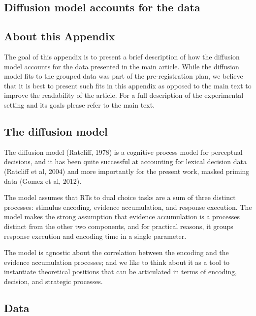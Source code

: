 \documentclass[
  english,
  man,floatsintext]{apa6}
\begin{document}
\begin{appendix}
\hypertarget{diffusion-model-accounts-for-the-data}{%
\section{Diffusion model accounts for the
data}\label{diffusion-model-accounts-for-the-data}}

\hypertarget{about-this-appendix}{%
\subsection{About this Appendix}\label{about-this-appendix}}

The goal of this appendix is to present a brief description of how the
diffusion model accounts for the data presented in the main article.
While the diffusion model fits to the grouped data was part of the
pre-registration plan, we believe that it is best to present such fits
in this appendix as opposed to the main text to improve the readability
of the article. For a full description of the experimental setting and
its goals please refer to the main text.

\hypertarget{the-diffusion-model}{%
\subsection{The diffusion model}\label{the-diffusion-model}}

The diffusion model (Ratcliff, 1978) is a cognitive process model for
perceptual decisions, and it has been quite successful at accounting for
lexical decision data (Ratcliff et al, 2004) and more importantly for
the present work, masked priming data (Gomez et al, 2012).

The model assumes that RTs to dual choice tasks are a sum of three
distinct processes: stimulus encoding, evidence accumulation, and
response execution. The model makes the strong assumption that evidence
accumulation is a processes distinct from the other two components, and
for practical reasons, it groups response execution and encoding time in
a single parameter.

The model is agnostic about the correlation between the encoding and the
evidence accumulation processes; and we like to think about it as a tool
to instantiate theoretical positions that can be articulated in terms of
encoding, decision, and strategic processes.

\hypertarget{data}{%
\subsection{Data}\label{data}}


\end{appendix}
\end{document}
